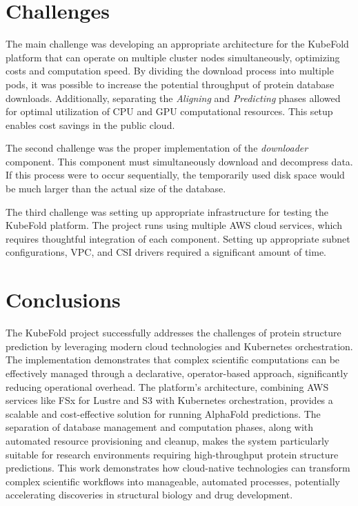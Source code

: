 \section{Challenges}

The main challenge was developing an appropriate architecture for the KubeFold platform that can operate on multiple cluster nodes simultaneously, optimizing costs and computation speed.
By dividing the download process into multiple pods, it was possible to increase the potential throughput of protein database downloads.
Additionally, separating the \textit{Aligning} and \textit{Predicting} phases allowed for optimal utilization of CPU and GPU computational resources.
This setup enables cost savings in the public cloud.

The second challenge was the proper implementation of the \textit{downloader} component.
This component must simultaneously download and decompress data.
If this process were to occur sequentially, the temporarily used disk space would be much larger than the actual size of the database.

The third challenge was setting up appropriate infrastructure for testing the KubeFold platform.
The project runs using multiple AWS cloud services, which requires thoughtful integration of each component.
Setting up appropriate subnet configurations, VPC, and CSI drivers required a significant amount of time.

\section{Conclusions}

The KubeFold project successfully addresses the challenges of protein structure prediction by leveraging modern cloud technologies and Kubernetes orchestration.
The implementation demonstrates that complex scientific computations can be effectively managed through a declarative, operator-based approach, significantly reducing operational overhead.
The platform's architecture, combining AWS services like FSx for Lustre and S3 with Kubernetes orchestration, provides a scalable and cost-effective solution for running AlphaFold predictions.
The separation of database management and computation phases, along with automated resource provisioning and cleanup, makes the system particularly suitable for research environments requiring high-throughput protein structure predictions.
This work demonstrates how cloud-native technologies can transform complex scientific workflows into manageable, automated processes, potentially accelerating discoveries in structural biology and drug development.